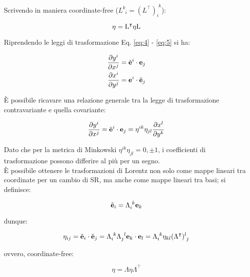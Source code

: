 Scrivendo in maniera coordinate-free ($ L^k_{\,\,\,i} = (L^{\intercal})^{\,\,k}_i $):

\begin{equation}
	\eta = \mathrm{L}^{\intercal} \eta \mathrm{L}
	\label{eq:2.7}
\end{equation}

Riprendendo le leggi di trasformazione Eq. \ref{eq:4} - \ref{eq:5} si ha:

\begin{equation}
	\begin{split}
		\frac{\partial y^i}{\partial x^j} &= \tilde{\mathbf{e}}^i \cdot \mathbf{e}_j\\
		\frac{\partial x^i}{\partial y^j} &= \mathbf{e}^i \cdot \tilde{\mathbf{e}}_j
	\end{split}
	\label{eq:2.8}
\end{equation}

È possibile ricavare una relazione generale tra la legge di trasformazione contravariante e quella covariante:

\begin{equation}
	\frac{\partial y^i}{\partial x^j} = \tilde{\mathbf{e}}^i \cdot \mathbf{e}_j = \eta^{ik} \eta_{jl} \frac{\partial x^l}{\partial y^k}
	\label{eq:2.9}
\end{equation}

Dato che per la metrica di Minkowski $ \eta^{ik} \eta_{jl} = 0, \pm 1 $, i coefficienti di trasformazione possono differire al più per un segno.\\
È possibile ottenere le trasformazioni di Lorentz non solo come mappe lineari tra coordinate per un cambio di SR, ma anche come mappe lineari tra basi; si definisce:

\begin{equation}
	\tilde{\mathbf{e}}_i = \Lambda_{i}^{\,\,k} \mathbf{e}_k
	\label{eq:2.10}
\end{equation}

dunque:

\begin{equation}
	\eta_{ij} = \tilde{\mathbf{e}}_i \cdot \tilde{\mathbf{e}}_j = \Lambda_i^{\,\,k} \Lambda_j^{\,\,\,l} \mathbf{e}_k \cdot \mathbf{e}_l = \Lambda_i^{\,\,k} \eta_{kl} (\Lambda^{\intercal})_{\,\,j}^l
	\label{eq:2.11}
\end{equation}

ovvero, coordinate-free:

\begin{equation}
	\eta = \Lambda \eta \Lambda^{\intercal}
	\label{eq:2.12}
\end{equation}

